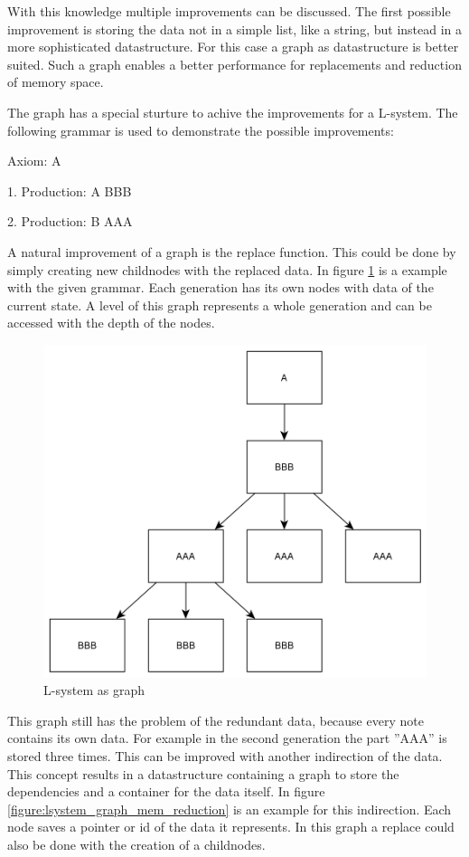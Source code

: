 \documentclass[english]{cpp-hmwk}
\begin{document}
\medskip
\noindent With this knowledge multiple improvements can be discussed. The first possible improvement is storing the data not in a simple list, like a string, but instead in a more sophisticated datastructure. For this case a graph as datastructure is better suited. Such a graph enables a better performance for replacements and reduction of memory space.

\medskip
\noindent The graph has a special sturture to achive the improvements for a L-system. The following grammar is used to demonstrate the possible improvements:
 
Axiom: A

1. Production: A \rightarrow BBB

2. Production: B \rightarrow AAA

\medskip

\noindent A natural improvement of a graph is the replace function. This could be done by simply creating new childnodes with the replaced data. In figure \ref{figure:lsystem_graph} is a example with the given grammar. Each generation has its own nodes with data of the current state. A level of this graph represents a whole generation and can be accessed with the depth of the nodes.

\begin{figure}[h!]
	\centering
	\includegraphics[width=0.8\columnwidth]{../graphs/LSystem/examples/lsystem_graph_example.png}
	\caption{L-system as graph}
	\label{figure:lsystem_graph}
\end{figure}

\medskip

\noindent This graph still has the problem of the redundant data, because every note contains its own data. For example in the second generation the part ''AAA'' is stored three times. This can be improved with another indirection of the data. This concept results in a datastructure containing a graph to store the dependencies and a container for the data itself. In figure \ref{figure:lsystem_graph_mem_reduction} is an example for this indirection. Each node saves a pointer or id of the data it represents. In this graph a replace could also be done with the creation of a childnodes.
\end{document}
